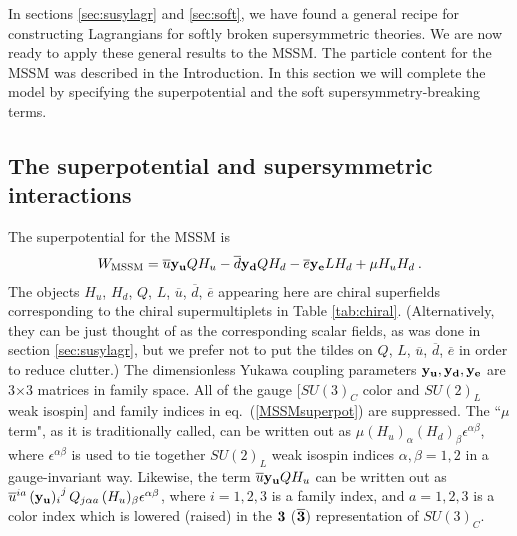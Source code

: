 \documentclass[12pt]{article}
\def\beq{\begin{eqnarray}}
\def\eeq{\end{eqnarray}}
\def\sbar{\overline}
\begin{document}
In sections \ref{sec:susylagr} and \ref{sec:soft}, we have found a general
recipe for constructing Lagrangians for softly broken supersymmetric
theories. We are now ready to apply these general results to the MSSM. The
particle content for the MSSM was described in the Introduction. In this
section we will complete the model by specifying the superpotential and
the soft supersymmetry-breaking terms. 

\subsection{The superpotential and supersymmetric
interactions}\label{subsec:mssm.superpotential}
\setcounter{equation}{0}
\setcounter{footnote}{1}

The superpotential for the MSSM is 
\beq
W_{\rm MSSM} =
\sbar u {\bf y_u} Q H_u -
\sbar d {\bf y_d} Q H_d -
\sbar e {\bf y_e} L H_d +
\mu H_u H_d \> .
\label{MSSMsuperpot}
\eeq
The objects $H_u$, $H_d$, $Q$, $L$, $\sbar u$, $\sbar d$, $\sbar e$
appearing here are chiral superfields corresponding to the chiral
supermultiplets in Table \ref{tab:chiral}.  (Alternatively, they can be
just thought of as the corresponding scalar fields, as was done in section
\ref{sec:susylagr}, but we prefer not to put the tildes on $Q$, $L$,
$\sbar u$, $\sbar d$, $\sbar e$ in order to reduce clutter.) The
dimensionless Yukawa coupling parameters ${\bf y_u}, {\bf y_d}, {\bf y_e}$
are 3$\times 3$ matrices in family space. All of the gauge [$SU(3)_C$
color and $SU(2)_L$ weak isospin] and family indices in
eq.~(\ref{MSSMsuperpot}) are suppressed. The ``$\mu$ term", as it is
traditionally called, can be written out as $\mu (H_u)_\alpha (H_d)_\beta
\epsilon^{\alpha\beta}$, where $\epsilon^{\alpha\beta}$ is used to tie
together $SU(2)_L$ weak isospin indices $\alpha,\beta=1,2$ in a
gauge-invariant way. Likewise, the term $\sbar u {\bf y_u} Q H_u$ can be
written out as $\sbar u^{ia}\, {({\bf y_u})_i}^j\, Q_{j\alpha a}\,
(H_u)_\beta \epsilon^{\alpha \beta}$, where $i=1,2,3$ is a family index,
and $a=1,2,3$ is a color index which is lowered (raised) in the $\bf 3$
($\bf \overline 3$) representation of $SU(3)_C$. 
\end{document}
